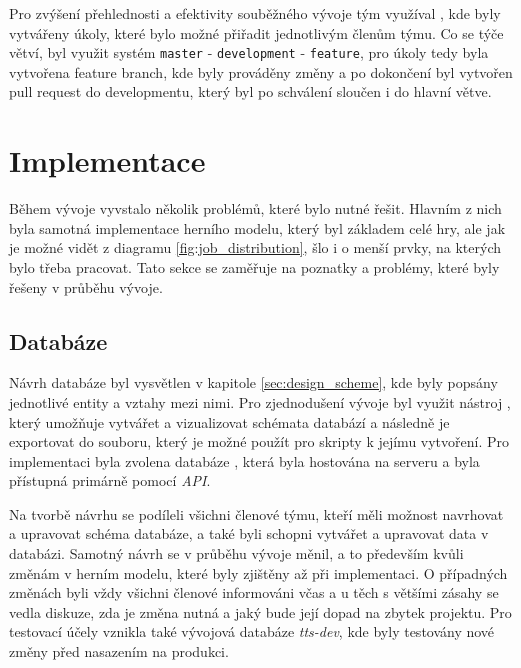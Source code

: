 Pro zvýšení přehlednosti a efektivity souběžného vývoje tým využíval , kde byly vytvářeny úkoly, které bylo možné přiřadit jednotlivým členům týmu. Co se týče větví, byl využit systém \texttt{master} - \texttt{development} - \texttt{feature}, pro úkoly tedy byla vytvořena feature branch, kde byly prováděny změny a po dokončení byl vytvořen pull request do developmentu, který byl po schválení sloučen i do hlavní větve.


\section{Implementace}
\label{sec:implementation}

Během vývoje vyvstalo několik problémů, které bylo nutné řešit. Hlavním z nich byla samotná implementace herního modelu, který byl základem celé hry, ale jak je možné vidět z diagramu \ref{fig:job_distribution}, šlo i o menší prvky, na kterých bylo třeba pracovat. Tato sekce se zaměřuje na poznatky a problémy, které byly řešeny v průběhu vývoje.

\subsection{Databáze}
\label{subsec:database}

Návrh databáze byl vysvětlen v kapitole \ref{sec:design_scheme}, kde byly popsány jednotlivé entity a vztahy mezi nimi. Pro zjednodušení vývoje byl využit nástroj , který umožňuje vytvářet a vizualizovat schémata databází a následně je exportovat do souboru, který je možné použít pro skripty k jejímu vytvoření. Pro implementaci byla zvolena databáze , která byla hostována na serveru a byla přístupná primárně pomocí \textit{API}.

Na tvorbě návrhu se podíleli všichni členové týmu, kteří měli možnost navrhovat a upravovat schéma databáze, a také byli schopni vytvářet a upravovat data v databázi. Samotný návrh se v průběhu vývoje měnil, a to především kvůli změnám v herním modelu, které byly zjištěny až při implementaci. O případných změnách byli vždy všichni členové informováni včas a u těch s většími zásahy se vedla diskuze, zda je změna nutná a jaký bude její dopad na zbytek projektu. Pro testovací účely vznikla také vývojová databáze \textit{tts-dev}, kde byly testovány nové změny před nasazením na produkci.

